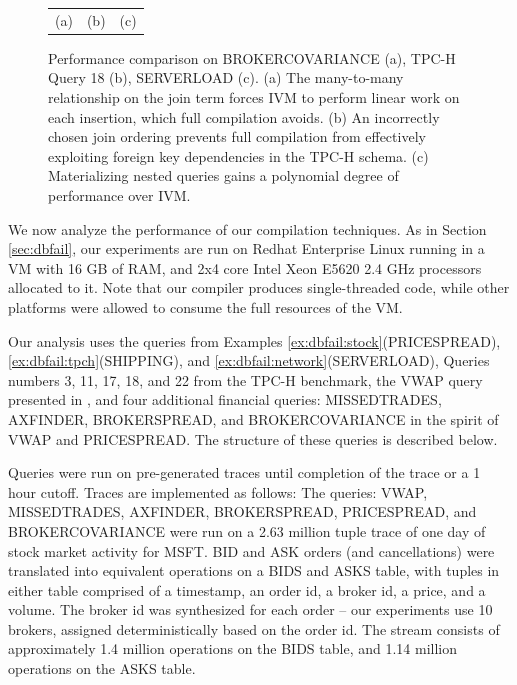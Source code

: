 \begin{figure}
\begin{center}
\begin{minipage}{\textwidth}
\begin{tabular}{ccc}
\\
(a) & (b) & (c)
\end{tabular}
\caption{Performance comparison on BROKERCOVARIANCE (a), TPC-H Query 18 (b), SERVERLOAD (c). (a) The many-to-many relationship on the join term forces IVM to perform linear work on each insertion, which full compilation avoids. (b) An incorrectly chosen join ordering prevents full compilation from effectively exploiting foreign key dependencies in the TPC-H schema. (c) Materializing nested queries gains a polynomial degree of performance over IVM.}
\label{fig:experiments:brokervariance}
\label{fig:experiments:tpch18}
\label{fig:experiments:serverload}
\end{minipage}
\end{center}
\end{figure}

We now analyze the performance of our compilation techniques.  As in Section \ref{sec:dbfail}, our experiments are run on Redhat Enterprise Linux running in a VM with 16 GB of RAM, and 2x4 core Intel Xeon E5620 2.4 GHz processors allocated to it.  Note that our compiler produces single-threaded code, while other platforms were allowed to consume the full resources of the VM.
 
Our analysis uses the queries from Examples \ref{ex:dbfail:stock}(PRICESPREAD),  \ref{ex:dbfail:tpch}(SHIPPING), and \ref{ex:dbfail:network}(SERVERLOAD), Queries numbers 3, 11, 17, 18, and 22 from the TPC-H\cite{tpch} benchmark, the VWAP query presented in \cite{kennedy-ahmad-koch-cidr:11}, and four additional financial queries: MISSEDTRADES, AXFINDER, BROKERSPREAD, and BROKERCOVARIANCE in the spirit of VWAP and PRICESPREAD.  The structure of these queries is described below.

Queries were run on pre-generated traces until completion of the trace or a 1 hour cutoff.  Traces are implemented as follows: The queries: VWAP, MISSEDTRADES, AXFINDER, BROKERSPREAD, PRICESPREAD, and BROKERCOVARIANCE were run on a 2.63 million tuple trace of one day of stock market activity for MSFT.  BID and ASK orders (and cancellations) were translated into equivalent operations on a BIDS and ASKS table, with tuples in either table comprised of a timestamp, an order id, a broker id, a price, and a volume.  The broker id was synthesized for each order -- our experiments use 10 brokers, assigned deterministically based on the order id.  The stream consists of approximately 1.4 million operations on the BIDS table, and 1.14 million operations on the ASKS table.

